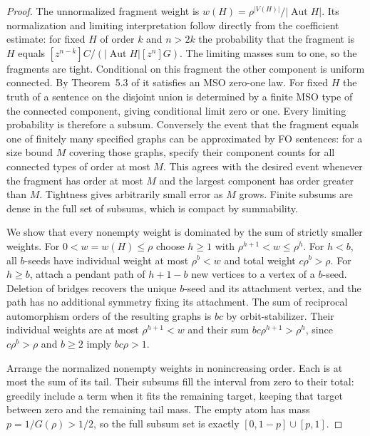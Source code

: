 \documentclass[11pt]{article}
\newcommand{\Aut}{\operatorname{Aut}}
\begin{document}
\begin{proof}
The unnormalized fragment weight is $w(H)=\rho^{|V(H)|}/|\Aut H|$. Its normalization and limiting interpretation follow directly from the coefficient estimate: for fixed $H$ of order $k$ and $n>2k$ the probability that the fragment is $H$ equals $[z^{n-k}]C/(|\Aut H|[z^n]G)$. The limiting masses sum to one, so the fragments are tight. Conditional on this fragment the other component is uniform connected. By Theorem~5.3 of \cite{dawar} it satisfies an MSO zero-one law. For fixed $H$ the truth of a sentence on the disjoint union is determined by a finite MSO type of the connected component, giving conditional limit zero or one. Every limiting probability is therefore a subsum. Conversely the event that the fragment equals one of finitely many specified graphs can be approximated by FO sentences: for a size bound $M$ covering those graphs, specify their component counts for all connected types of order at most $M$. This agrees with the desired event whenever the fragment has order at most $M$ and the largest component has order greater than $M$. Tightness gives arbitrarily small error as $M$ grows. Finite subsums are dense in the full set of subsums, which is compact by summability.

We show that every nonempty weight is dominated by the sum of strictly smaller weights. For $0<w=w(H)\le\rho$ choose $h\ge1$ with $\rho^{h+1}<w\le\rho^h$. For $h<b$, all $b$-seeds have individual weight at most $\rho^b<w$ and total weight $c\rho^b>\rho$. For $h\ge b$, attach a pendant path of $h+1-b$ new vertices to a vertex of a $b$-seed. Deletion of bridges recovers the unique $b$-seed and its attachment vertex, and the path has no additional symmetry fixing its attachment. The sum of reciprocal automorphism orders of the resulting graphs is $bc$ by orbit-stabilizer. Their individual weights are at most $\rho^{h+1}<w$ and their sum $bc\rho^{h+1}>\rho^h$, since $c\rho^b>\rho$ and $b\ge 2$ imply $bc\rho>1$.

Arrange the normalized nonempty weights in nonincreasing order. Each is at most the sum of its tail. Their subsums fill the interval from zero to their total: greedily include a term when it fits the remaining target, keeping that target between zero and the remaining tail mass. The empty atom has mass $p=1/G(\rho)>1/2$, so the full subsum set is exactly $[0,1-p]\cup[p,1]$.
\end{proof}
\end{document}
